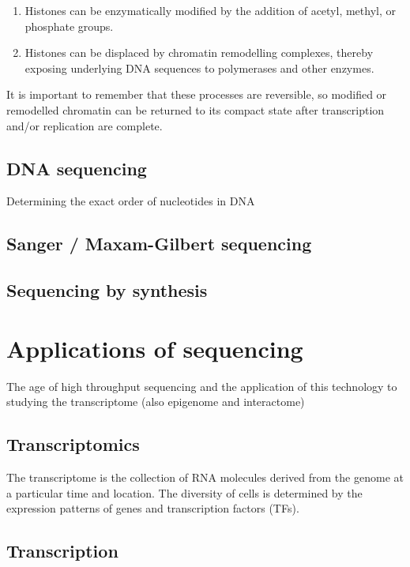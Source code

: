 \begin{enumerate}
   \item Histones can be enzymatically modified by the addition of acetyl, methyl, or phosphate groups.
   \item Histones can be displaced by chromatin remodelling complexes, thereby exposing underlying DNA sequences to polymerases and other enzymes.
\end{enumerate}

It is important to remember that these processes are reversible, so modified or remodelled chromatin can be returned to its compact state after transcription and/or replication are complete.

\subsection{DNA sequencing}

Determining the exact order of nucleotides in DNA

\subsection{Sanger / Maxam-Gilbert sequencing}

\subsection{Sequencing by synthesis}

\section{Applications of sequencing}

The age of high throughput sequencing and the application of this technology to studying the transcriptome (also epigenome and interactome)

\subsection{Transcriptomics}

The transcriptome is the collection of RNA molecules derived from the genome at a particular time and location. The diversity of cells is determined by the expression patterns of genes and transcription factors (TFs).

\subsection{Transcription}

